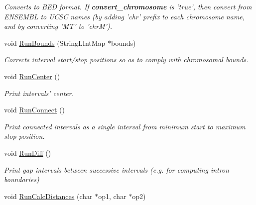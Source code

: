 \begin{DoxyCompactItemize}
\begin{DoxyCompactList}\small\item\em Converts to BED format. If {\bfseries convert\_\-chromosome} is 'true', then convert from ENSEMBL to UCSC names (by adding 'chr' prefix to each chromosome name, and by converting 'MT' to 'chrM'). \end{DoxyCompactList}\item 
\hypertarget{classGenomicRegionSet_ad7ad039dd702837f37c2cdfebd9b2845}{
void \hyperlink{classGenomicRegionSet_ad7ad039dd702837f37c2cdfebd9b2845}{RunBounds} (StringLIntMap $\ast$bounds)}
\label{classGenomicRegionSet_ad7ad039dd702837f37c2cdfebd9b2845}

\begin{DoxyCompactList}\small\item\em Corrects interval start/stop positions so as to comply with chromosomal bounds. \end{DoxyCompactList}\item 
\hypertarget{classGenomicRegionSet_a1aa8f41f0978e9b66c6f11c0ccb95a0b}{
void \hyperlink{classGenomicRegionSet_a1aa8f41f0978e9b66c6f11c0ccb95a0b}{RunCenter} ()}
\label{classGenomicRegionSet_a1aa8f41f0978e9b66c6f11c0ccb95a0b}

\begin{DoxyCompactList}\small\item\em Print intervals' center. \end{DoxyCompactList}\item 
\hypertarget{classGenomicRegionSet_a752b7d4d2ac3568e7bdb13edbfc00af3}{
void \hyperlink{classGenomicRegionSet_a752b7d4d2ac3568e7bdb13edbfc00af3}{RunConnect} ()}
\label{classGenomicRegionSet_a752b7d4d2ac3568e7bdb13edbfc00af3}

\begin{DoxyCompactList}\small\item\em Print connected intervals as a single interval from minimum start to maximum stop position. \end{DoxyCompactList}\item 
\hypertarget{classGenomicRegionSet_a90256738bd85501460874ab8e69b894b}{
void \hyperlink{classGenomicRegionSet_a90256738bd85501460874ab8e69b894b}{RunDiff} ()}
\label{classGenomicRegionSet_a90256738bd85501460874ab8e69b894b}

\begin{DoxyCompactList}\small\item\em Print gap intervals between successive intervals (e.g. for computing intron boundaries) \end{DoxyCompactList}\item 
\hypertarget{classGenomicRegionSet_a22f3fce9421a0f80c96ec0a9346fec19}{
void \hyperlink{classGenomicRegionSet_a22f3fce9421a0f80c96ec0a9346fec19}{RunCalcDistances} (char $\ast$op1, char $\ast$op2)}
\label{classGenomicRegionSet_a22f3fce9421a0f80c96ec0a9346fec19}


\end{DoxyCompactItemize}

